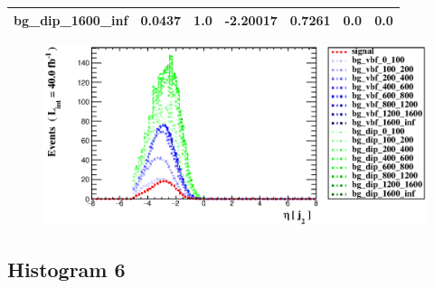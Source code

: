 \documentclass[a4paper, 10pt]{article}
\begin{document}
\begin{table}[H]
\begin{center}
\begin{tabular}{|m{23.0mm}|m{23.0mm}|m{18.0mm}|m{19.0mm}|m{19.0mm}|m{19.0mm}|m{19.0mm}|}
      \hline
      {\cellcolor{white}         bg\_dip\_1600\_inf}& {\cellcolor{white}         0.0437}& {\cellcolor{white}         1.0}& {\cellcolor{white}         -2.20017}& {\cellcolor{white}         0.7261}& {\cellcolor{green}         0.0}& {\cellcolor{green}         0.0}\\
\hline
    \end{tabular}
  \end{center}
\end{table}

\begin{figure}[H]
  \begin{center}
    \includegraphics[scale=0.45]{selection_4.eps}\\
\caption{   }
  \end{center}
\end{figure}
      \newpage
\subsection{ Histogram 6}
\end{document}
